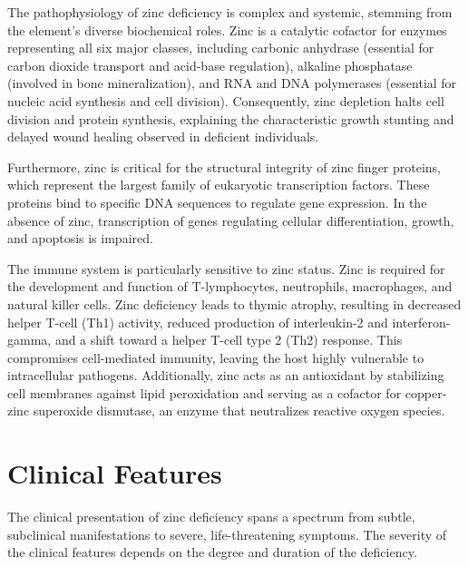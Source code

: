 The pathophysiology of zinc deficiency is complex and systemic, stemming from the element's diverse biochemical roles. Zinc is a catalytic cofactor for enzymes representing all six major classes, including carbonic anhydrase (essential for carbon dioxide transport and acid-base regulation), alkaline phosphatase (involved in bone mineralization), and RNA and DNA polymerases (essential for nucleic acid synthesis and cell division). Consequently, zinc depletion halts cell division and protein synthesis, explaining the characteristic growth stunting and delayed wound healing observed in deficient individuals.

Furthermore, zinc is critical for the structural integrity of zinc finger proteins, which represent the largest family of eukaryotic transcription factors. These proteins bind to specific DNA sequences to regulate gene expression. In the absence of zinc, transcription of genes regulating cellular differentiation, growth, and apoptosis is impaired.

The immune system is particularly sensitive to zinc status. Zinc is required for the development and function of T-lymphocytes, neutrophils, macrophages, and natural killer cells. Zinc deficiency leads to thymic atrophy, resulting in decreased helper T-cell (Th1) activity, reduced production of interleukin-2 and interferon-gamma, and a shift toward a helper T-cell type 2 (Th2) response. This compromises cell-mediated immunity, leaving the host highly vulnerable to intracellular pathogens. Additionally, zinc acts as an antioxidant by stabilizing cell membranes against lipid peroxidation and serving as a cofactor for copper-zinc superoxide dismutase, an enzyme that neutralizes reactive oxygen species.

\section*{Clinical Features}
The clinical presentation of zinc deficiency spans a spectrum from subtle, subclinical manifestations to severe, life-threatening symptoms. The severity of the clinical features depends on the degree and duration of the deficiency.

